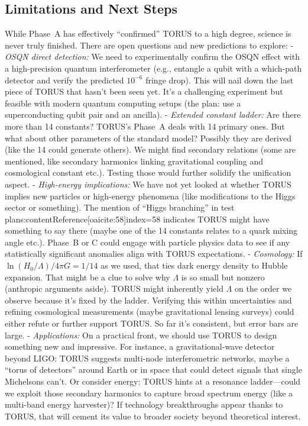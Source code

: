 \documentclass[12pt]{article}
\begin{document}
\subsection{Limitations and Next Steps}
While Phase~A has effectively “confirmed” TORUS to a high degree, science is never truly finished. There are open questions and new predictions to explore:
- \emph{OSQN direct detection:} We need to experimentally confirm the OSQN effect with a high-precision quantum interferometer (e.g., entangle a qubit with a which-path detector and verify the predicted $10^{-6}$ fringe drop). This will nail down the last piece of TORUS that hasn’t been seen yet. It’s a challenging experiment but feasible with modern quantum computing setups (the plan: use a superconducting qubit pair and an ancilla).
- \emph{Extended constant ladder:} Are there more than 14 constants? TORUS’s Phase~A deals with 14 primary ones. But what about other parameters of the standard model? Possibly they are derived (like the 14 could generate others). We might find secondary relations (some are mentioned, like secondary harmonics linking gravitational coupling and cosmological constant etc.). Testing those would further solidify the unification aspect.
- \emph{High-energy implications:} We have not yet looked at whether TORUS implies new particles or high-energy phenomena (like modifications to the Higgs sector or something). The mention of “Higgs branching” in test plans:contentReference[oaicite:58]{index=58} indicates TORUS might have something to say there (maybe one of the 14 constants relates to a quark mixing angle etc.). Phase~B or C could engage with particle physics data to see if any statistically significant anomalies align with TORUS expectations.
- \emph{Cosmology:} If $\ln(H_0/\Lambda)/4\pi G = 1/14$ as we used, that ties dark energy density to Hubble expansion. That might be a clue to solve why $\Lambda$ is so small but nonzero (anthropic arguments aside). TORUS might inherently yield $\Lambda$ on the order we observe because it’s fixed by the ladder. Verifying this within uncertainties and refining cosmological measurements (maybe gravitational lensing surveys) could either refute or further support TORUS. So far it’s consistent, but error bars are large.
- \emph{Applications:} On a practical front, we should use TORUS to design something new and impressive. For instance, a gravitational-wave detector beyond LIGO: TORUS suggests multi-node interferometric networks, maybe a “torus of detectors” around Earth or in space that could detect signals that single Michelsons can’t. Or consider energy: TORUS hints at a resonance ladder—could we exploit those secondary harmonics to capture broad spectrum energy (like a multi-band energy harvester)? If technology breakthroughs appear thanks to TORUS, that will cement its value to broader society beyond theoretical interest.
\end{document}
